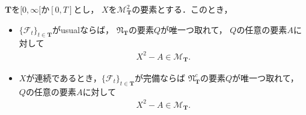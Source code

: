 	\begin{sketch}\mbox{}
		\begin{description}
			\item[]
		\end{description}
	\end{sketch}
	
	\begin{screen}
		\begin{thm}[二乗可積分マルチンゲールは増大過程とマルチンゲールに分解できる]
		\label{thm:decomposition_of_square_integrable_martingales}
			$\mathbf{T}$を$[0,\infty[$か$[0,T]$とし，
			$X$を$\mathscr{M}^2_{\mathbf{T}}$の要素とする．このとき，
			\begin{itemize}
				\item $\{\mathscr{F}_t\}_{t \in \mathbf{T}}$がusualならば，
					$\mathfrak{N}_{\mathbf{T}}$の要素$Q$が唯一つ取れて，
					$Q$の任意の要素$A$に対して
					\begin{align}
						X^2 - A \in \mathscr{M}_{\mathbf{T}}.
					\end{align}
					
				\item $X$が連続であるとき，$\{\mathscr{F}_t\}_{t \in \mathbf{T}}$が完備ならば
					$\mathfrak{N}^c_{\mathbf{T}}$の要素$Q$が唯一つ取れて，
					$Q$の任意の要素$A$に対して
					\begin{align}
						X^2 - A \in \mathscr{M}_{\mathbf{T}}.
					\end{align}
			\end{itemize}
		\end{thm}
	\end{screen}
	
